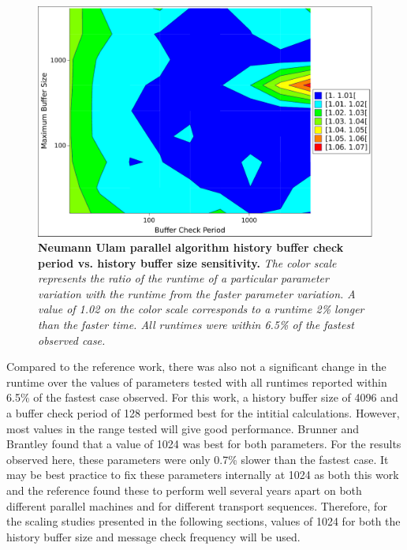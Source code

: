 \begin{figure}[t!]
  \begin{center}
    \includegraphics[width=6in]{chapters/parallel_mc/titan_comm_parameters.pdf}
  \end{center}
  \caption{\textbf{Neumann Ulam parallel algorithm history buffer
      check period vs. history buffer size sensitivity.} \textit{The
      color scale represents the ratio of the runtime of a particular
      parameter variation with the runtime from the faster parameter
      variation. A value of 1.02 on the color scale corresponds to a
      runtime 2\% longer than the faster time. All runtimes were
      within 6.5\% of the fastest observed case.}}
  \label{fig:titan_comm_parameters}
\end{figure}

Compared to the reference work, there was also not a significant
change in the runtime over the values of parameters tested with all
runtimes reported within 6.5\% of the fastest case observed. For this
work, a history buffer size of 4096 and a buffer check period of 128
performed best for the intitial calculations. However, most values in
the range tested will give good performance. Brunner and Brantley
found that a value of 1024 was best for both parameters. For the
results observed here, these parameters were only 0.7\% slower than
the fastest case. It may be best practice to fix these parameters
internally at 1024 as both this work and the reference found these to
perform well several years apart on both different parallel machines
and for different transport sequences. Therefore, for the scaling
studies presented in the following sections, values of 1024 for both
the history buffer size and message check frequency will be used.

